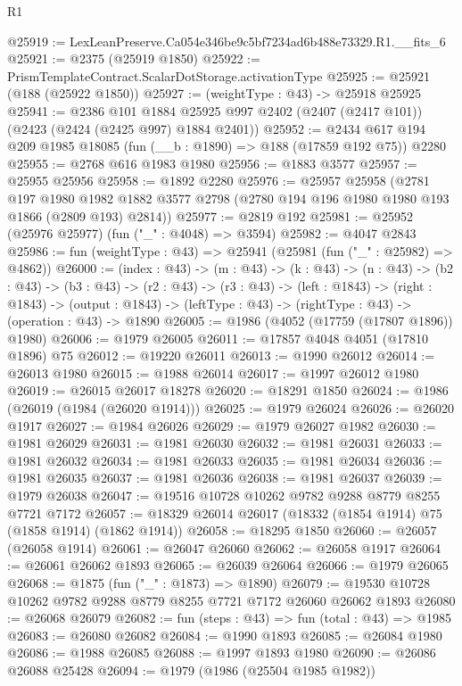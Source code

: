 \begin{lexlean}{R1}
\begin{coremodule}
@25919 := LexLeanPreserve.Ca054e346be9c5bf7234ad6b488e73329.R1.__fits_6
@25921 := @2375 (@25919 @1850)
@25922 := PrismTemplateContract.ScalarDotStorage.activationType
@25925 := @25921 (@188 (@25922 @1850))
@25927 := (weightType : @43) -> @25918 @25925
@25941 := @2386
    @101
    @1884
    @25925
    @997
    @2402
    (@2407 (@2417 @101))
    (@2423 (@2424 (@2425 @997) @1884 @2401))
@25952 := @2434 @617 @194 @209 @1985 @18085 (fun (__b : @1890) => @188 (@17859 @192 @75)) @2280
@25955 := @2768 @616 @1983 @1980
@25956 := @1883 @3577
@25957 := @25955 @25956
@25958 := @1892 @2280
@25976 := @25957
    @25958
    (@2781
      @197
      @1980
      @1982
      @1882
      @3577
      @2798
      (@2780 @194 @196 @1980 @1980 @193 @1866 (@2809 @193) @2814))
@25977 := @2819 @192
@25981 := @25952 (@25976 @25977) (fun ("_" : @4048) => @3594)
@25982 := @4047 @2843
@25986 := fun (weightType : @43) => @25941 (@25981 (fun ("_" : @25982) => @4862))
@26000 := (index : @43) ->
  (m : @43) ->
  (k : @43) ->
  (n : @43) ->
  (b2 : @43) ->
  (b3 : @43) ->
  (r2 : @43) ->
  (r3 : @43) ->
  (left : @1843) ->
  (right : @1843) ->
  (output : @1843) -> (leftType : @43) -> (rightType : @43) -> (operation : @43) -> @1890
@26005 := @1986 (@4052 (@17759 (@17807 @1896)) @1980)
@26006 := @1979 @26005
@26011 := @17857 @4048 @4051 (@17810 @1896) @75
@26012 := @19220 @26011
@26013 := @1990 @26012
@26014 := @26013 @1980
@26015 := @1988 @26014
@26017 := @1997 @26012 @1980
@26019 := @26015 @26017 @18278
@26020 := @18291 @1850
@26024 := @1986 (@26019 (@1984 (@26020 @1914)))
@26025 := @1979 @26024
@26026 := @26020 @1917
@26027 := @1984 @26026
@26029 := @1979 @26027 @1982
@26030 := @1981 @26029
@26031 := @1981 @26030
@26032 := @1981 @26031
@26033 := @1981 @26032
@26034 := @1981 @26033
@26035 := @1981 @26034
@26036 := @1981 @26035
@26037 := @1981 @26036
@26038 := @1981 @26037
@26039 := @1979 @26038
@26047 := @19516 @10728 @10262 @9782 @9288 @8779 @8255 @7721 @7172
@26057 := @18329 @26014 @26017 (@18332 (@1854 @1914) @75 (@1858 @1914) (@1862 @1914))
@26058 := @18295 @1850
@26060 := @26057 (@26058 @1914)
@26061 := @26047 @26060
@26062 := @26058 @1917
@26064 := @26061 @26062 @1893
@26065 := @26039 @26064
@26066 := @1979 @26065
@26068 := @1875 (fun ("_" : @1873) => @1890)
@26079 := @19530 @10728 @10262 @9782 @9288 @8779 @8255 @7721 @7172 @26060 @26062 @1893
@26080 := @26068 @26079
@26082 := fun (steps : @43) => fun (total : @43) => @1985
@26083 := @26080 @26082
@26084 := @1990 @1893
@26085 := @26084 @1980
@26086 := @1988 @26085
@26088 := @1997 @1893 @1980
@26090 := @26086 @26088 @25428
@26094 := @1979 (@1986 (@25504 @1985 @1982))

\end{coremodule}
\end{lexlean}
